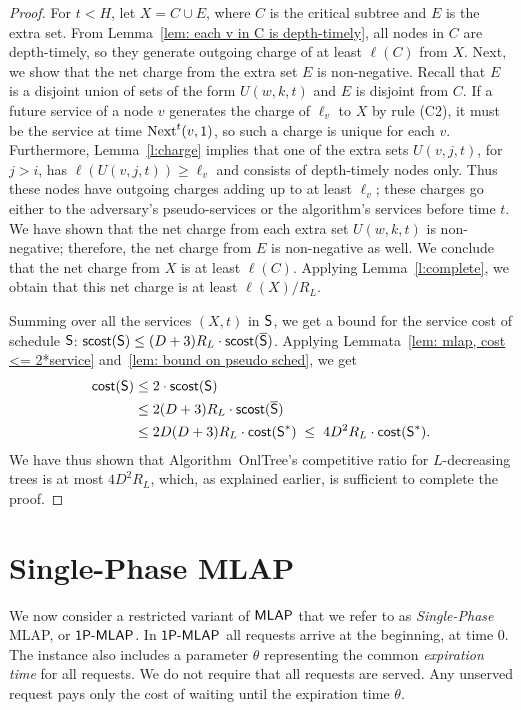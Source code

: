 \documentclass[a4paper]{article}
\newcommand{\cost}{\mbox{\rm\textsf{cost}}}
\newcommand{\scost}{\mbox{\rm\textsf{scost}}}
\newcommand{\length}{\ell}
\newcommand{\OnAlgTreesGeneral}{{\sc OnlTree}}
\newcommand{\MLAP}{\mbox{\rm\textsf{MLAP}}}
\newcommand{\SPMLAP}{\mbox{\rm\textsf{1P-MLAP}}}
\newcommand{\schedS}{\mbox{\rm\textsf{S}}}
\newcommand{\optschedS}{\mbox{\rm\textsf{S}}^\ast}
\newcommand{\pseudoschedS}{\overline{\mbox{\rm\textsf{S}}}}
\newcommand{\expiration}{\theta}
\newcommand{\nxt}[3]{\mbox{\rm Next}^#1(#2,#3)}
\begin{document}
\begin{proof}
For $t<H$, let $X=C\cup E$, where $C$ is the critical subtree and $E$
is the extra set. From Lemma~\ref{lem: each v in C is depth-timely},
all nodes in $C$ are depth-timely, so they generate outgoing charge of
at least $\length(C)$ from $X$.  Next, we show that the net charge
from the extra set $E$ is non-negative.  Recall that $E$ is a disjoint
union of sets of the form $U(w,k,t)$ and $E$ is disjoint from $C$.  If
a future service of a node $v$ generates the charge of $\length_v$
to $X$ by rule (C2), it must be the service at time $\nxt{t}{v}{1}$,
so such a charge is unique for each $v$.  Furthermore,
Lemma~\ref{l:charge} implies that one of the extra sets $U(v,j,t)$,
for $j>i$, has $\length(U(v,j,t))\geq \length_v$ and consists of
depth-timely nodes only. Thus these nodes have outgoing charges adding
up to at least $\length_v$; these charges go either to the adversary's
pseudo-services or the algorithm's services before time $t$.  We have
shown that the net charge from each extra set $U(w,k,t)$ is
non-negative; therefore, the net charge from $E$ is non-negative as
well.  We conclude that the net charge from $X$ is at least
$\length(C)$. Applying Lemma~\ref{l:complete}, we obtain that this net
charge is at least $\length(X)/R_L$.

Summing over all the services $(X,t)$ in $\schedS$, we get a bound for
the service cost of schedule $\schedS$: $\scost(\schedS) \le
(D+3)R_L\cdot\scost(\pseudoschedS)$.  Applying Lemmata~\ref{lem: mlap,
  cost <= 2*service} and~\ref{lem: bound on pseudo sched}, we get
\begin{align*}
\cost(\schedS) &\le 2\cdot \scost(\schedS)
			\\
			&\leq 2(D+3)R_L\cdot\scost(\pseudoschedS)
			\\
			&\leq 2D(D+3)R_L\cdot\cost(\optschedS)
			\;\le\;
			4D^2 R_L\cdot\cost(\optschedS).
\end{align*}
We have thus shown that Algorithm~{\OnAlgTreesGeneral}'s competitive
ratio for $L$-decreasing trees is at most $4D^2 R_L$, which, as
explained earlier, is sufficient to complete the proof.
\end{proof}


\section{Single-Phase {\MLAP}}
\label{sec: one-phase MLAP}

We now consider a restricted variant of $\MLAP$ that we refer to as
\emph{Single-Phase} {\MLAP}, or $\SPMLAP$. In $\SPMLAP$ all requests arrive at the beginning, at time $0$. 
The instance also
includes a parameter $\expiration$ representing the  common \emph{expiration time}
for all requests. We do not require that all requests are served. Any unserved
request pays only the cost of waiting until the expiration time $\expiration$. 
\end{document}
